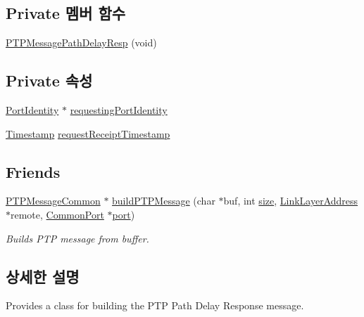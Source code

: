 \subsection*{Private 멤버 함수}
\begin{DoxyCompactItemize}
\item 
\hyperlink{class_p_t_p_message_path_delay_resp_a4634f817b11366bf78be956e0a2e2565}{P\+T\+P\+Message\+Path\+Delay\+Resp} (void)
\end{DoxyCompactItemize}
\subsection*{Private 속성}
\begin{DoxyCompactItemize}
\item 
\hyperlink{class_port_identity}{Port\+Identity} $\ast$ \hyperlink{class_p_t_p_message_path_delay_resp_a27e69c7fb521ebffca13229a7c4658ce}{requesting\+Port\+Identity}
\item 
\hyperlink{class_timestamp}{Timestamp} \hyperlink{class_p_t_p_message_path_delay_resp_a981c3fe148ecddf9f1091675650ccd48}{request\+Receipt\+Timestamp}
\end{DoxyCompactItemize}
\subsection*{Friends}
\begin{DoxyCompactItemize}
\item 
\hyperlink{class_p_t_p_message_common}{P\+T\+P\+Message\+Common} $\ast$ \hyperlink{class_p_t_p_message_path_delay_resp_a3f587ce328a50a9f7af19f9822579d0d}{build\+P\+T\+P\+Message} (char $\ast$buf, int \hyperlink{gst__avb__playbin_8c_a439227feff9d7f55384e8780cfc2eb82}{size}, \hyperlink{class_link_layer_address}{Link\+Layer\+Address} $\ast$remote, \hyperlink{class_common_port}{Common\+Port} $\ast$\hyperlink{gst__avb__playbin_8c_a63c89c04d1feae07ca35558055155ffb}{port})
\begin{DoxyCompactList}\small\item\em Builds P\+TP message from buffer. \end{DoxyCompactList}\end{DoxyCompactItemize}


\subsection{상세한 설명}
Provides a class for building the P\+TP Path Delay Response message. 

